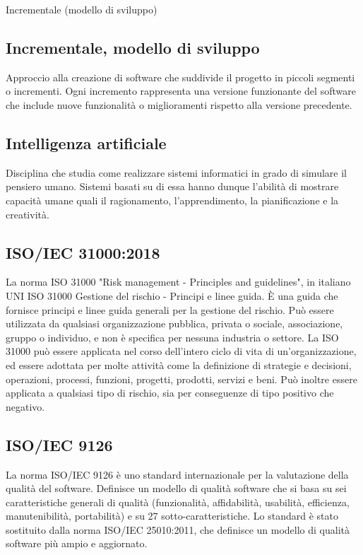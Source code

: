 \hypertarget{sec:modello_incrementale}{Incrementale (modello di sviluppo)}
\subsection*{Incrementale, modello di sviluppo}
Approccio alla creazione di software che suddivide il progetto in piccoli segmenti o incrementi. 
Ogni incremento rappresenta una versione funzionante del software che include nuove funzionalità o miglioramenti rispetto alla versione precedente.

\hypertarget{sec:intelligenza_artificiale}{}
\subsection*{Intelligenza artificiale}
Disciplina che studia come realizzare sistemi informatici in grado di simulare il pensiero umano. Sistemi basati su di essa hanno dunque l'abilità di mostrare 
capacità umane quali il ragionamento, l'apprendimento, la pianificazione e la creatività.

\hypertarget{ISO/IEC 31000:2018}{}
\subsection*{ISO/IEC 31000:2018}
La norma ISO 31000 "Risk management - Principles and guidelines", 
in italiano UNI ISO 31000 Gestione del rischio - Principi e linee guida. 
È una guida che fornisce principi e linee guida generali per la gestione del rischio. 
Può essere utilizzata da qualsiasi organizzazione pubblica, privata o sociale, associazione, gruppo o individuo, e non è specifica per nessuna industria o settore.
La ISO 31000 può essere applicata nel corso dell'intero ciclo di vita di un'organizzazione, ed essere adottata per molte attività come la definizione di strategie e decisioni, operazioni, processi, funzioni, progetti, prodotti, servizi e beni.
Può inoltre essere applicata a qualsiasi tipo di rischio, sia per conseguenze di tipo positivo che negativo. 

\hypertarget{ISO/IEC 9126}{}
\subsection*{ISO/IEC 9126}
La norma ISO/IEC 9126 è uno standard internazionale per la valutazione della qualità del software.
Definisce un modello di qualità software che si basa su sei caratteristiche generali di qualità (funzionalità, affidabilità, usabilità, efficienza,
manutenibilità, portabilità) e su 27 sotto-caratteristiche.
Lo standard è stato sostituito dalla norma ISO/IEC 25010:2011, che definisce un modello di qualità software più ampio e aggiornato.

